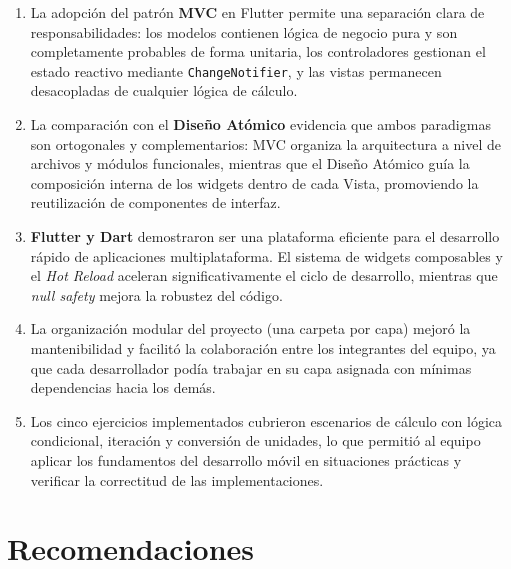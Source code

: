 \documentclass[12pt,a4paper]{article}
\begin{document}
\begin{enumerate}
  \item La adopción del patrón \textbf{MVC} en Flutter permite una separación clara de responsabilidades: los modelos contienen lógica de negocio pura y son completamente probables de forma unitaria, los controladores gestionan el estado reactivo mediante \texttt{ChangeNotifier}, y las vistas permanecen desacopladas de cualquier lógica de cálculo.

  \item La comparación con el \textbf{Diseño Atómico} evidencia que ambos paradigmas son ortogonales y complementarios: MVC organiza la arquitectura a nivel de archivos y módulos funcionales, mientras que el Diseño Atómico guía la composición interna de los widgets dentro de cada Vista, promoviendo la reutilización de componentes de interfaz.

  \item \textbf{Flutter y Dart} demostraron ser una plataforma eficiente para el desarrollo rápido de aplicaciones multiplataforma. El sistema de widgets composables y el \textit{Hot Reload} aceleran significativamente el ciclo de desarrollo, mientras que \textit{null safety} mejora la robustez del código.

  \item La organización modular del proyecto (una carpeta por capa) mejoró la mantenibilidad y facilitó la colaboración entre los integrantes del equipo, ya que cada desarrollador podía trabajar en su capa asignada con mínimas dependencias hacia los demás.

  \item Los cinco ejercicios implementados cubrieron escenarios de cálculo con lógica condicional, iteración y conversión de unidades, lo que permitió al equipo aplicar los fundamentos del desarrollo móvil en situaciones prácticas y verificar la correctitud de las implementaciones.
\end{enumerate}

\section{Recomendaciones}
\end{document}
